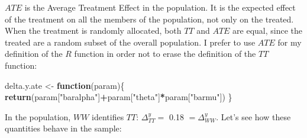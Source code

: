 \documentclass[]{book}
\newenvironment{Shaded}{\begin{snugshade}}{\end{snugshade}}
\newcommand{\ControlFlowTok}[1]{\textcolor[rgb]{0.13,0.29,0.53}{\textbf{#1}}}
\newcommand{\KeywordTok}[1]{\textcolor[rgb]{0.13,0.29,0.53}{\textbf{#1}}}
\newcommand{\NormalTok}[1]{#1}
\newcommand{\OperatorTok}[1]{\textcolor[rgb]{0.81,0.36,0.00}{\textbf{#1}}}
\newcommand{\StringTok}[1]{\textcolor[rgb]{0.31,0.60,0.02}{#1}}
\theoremstyle{definition}
\theoremstyle{definition}
\theoremstyle{definition}
\theoremstyle{remark}
\begin{document}
\(ATE\) is the Average Treatment Effect in the population.
It is the expected effect of the treatment on all the members of the population, not only on the treated.
When the treatment is randomly allocated, both \(TT\) and \(ATE\) are equal, since the treated are a random subset of the overall population.
I prefer to use \(ATE\) for my definition of the \(R\) function in order not to erase the definition of the \(TT\) function:

\begin{Shaded}
\begin{Highlighting}[]
\NormalTok{delta.y.ate <-}\StringTok{ }\ControlFlowTok{function}\NormalTok{(param)\{}
  \KeywordTok{return}\NormalTok{(param[}\StringTok{"baralpha"}\NormalTok{]}\OperatorTok{+}\NormalTok{param[}\StringTok{"theta"}\NormalTok{]}\OperatorTok{*}\NormalTok{param[}\StringTok{"barmu"}\NormalTok{])}
\NormalTok{\}}
\end{Highlighting}
\end{Shaded}

In the population, \(WW\) identifies \(TT\): \(\Delta^y_{TT}=\) 0.18 \(=\Delta^y_{WW}\).
Let's see how these quantities behave in the sample:
\end{document}
